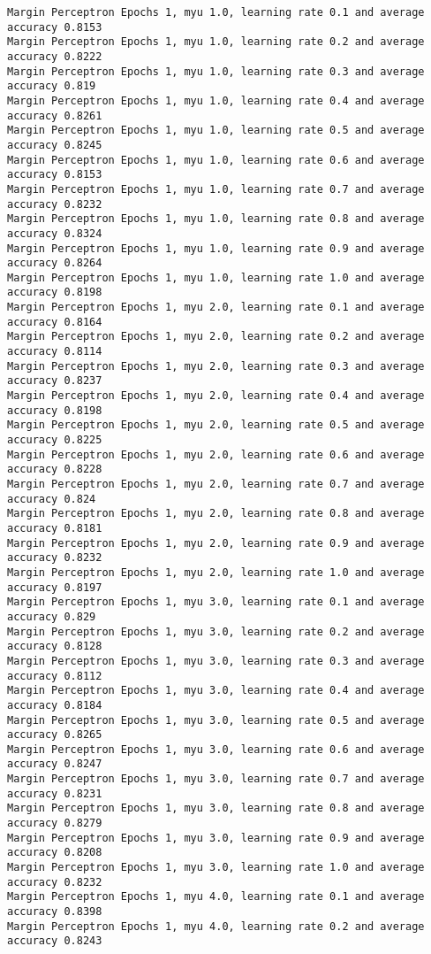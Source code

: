 \begin{Verbatim}[fontsize=\small]
Margin Perceptron Epochs 1, myu 1.0, learning rate 0.1 and average accuracy 0.8153
Margin Perceptron Epochs 1, myu 1.0, learning rate 0.2 and average accuracy 0.8222
Margin Perceptron Epochs 1, myu 1.0, learning rate 0.3 and average accuracy 0.819
Margin Perceptron Epochs 1, myu 1.0, learning rate 0.4 and average accuracy 0.8261
Margin Perceptron Epochs 1, myu 1.0, learning rate 0.5 and average accuracy 0.8245
Margin Perceptron Epochs 1, myu 1.0, learning rate 0.6 and average accuracy 0.8153
Margin Perceptron Epochs 1, myu 1.0, learning rate 0.7 and average accuracy 0.8232
Margin Perceptron Epochs 1, myu 1.0, learning rate 0.8 and average accuracy 0.8324
Margin Perceptron Epochs 1, myu 1.0, learning rate 0.9 and average accuracy 0.8264
Margin Perceptron Epochs 1, myu 1.0, learning rate 1.0 and average accuracy 0.8198
Margin Perceptron Epochs 1, myu 2.0, learning rate 0.1 and average accuracy 0.8164
Margin Perceptron Epochs 1, myu 2.0, learning rate 0.2 and average accuracy 0.8114
Margin Perceptron Epochs 1, myu 2.0, learning rate 0.3 and average accuracy 0.8237
Margin Perceptron Epochs 1, myu 2.0, learning rate 0.4 and average accuracy 0.8198
Margin Perceptron Epochs 1, myu 2.0, learning rate 0.5 and average accuracy 0.8225
Margin Perceptron Epochs 1, myu 2.0, learning rate 0.6 and average accuracy 0.8228
Margin Perceptron Epochs 1, myu 2.0, learning rate 0.7 and average accuracy 0.824
Margin Perceptron Epochs 1, myu 2.0, learning rate 0.8 and average accuracy 0.8181
Margin Perceptron Epochs 1, myu 2.0, learning rate 0.9 and average accuracy 0.8232
Margin Perceptron Epochs 1, myu 2.0, learning rate 1.0 and average accuracy 0.8197
Margin Perceptron Epochs 1, myu 3.0, learning rate 0.1 and average accuracy 0.829
Margin Perceptron Epochs 1, myu 3.0, learning rate 0.2 and average accuracy 0.8128
Margin Perceptron Epochs 1, myu 3.0, learning rate 0.3 and average accuracy 0.8112
Margin Perceptron Epochs 1, myu 3.0, learning rate 0.4 and average accuracy 0.8184
Margin Perceptron Epochs 1, myu 3.0, learning rate 0.5 and average accuracy 0.8265
Margin Perceptron Epochs 1, myu 3.0, learning rate 0.6 and average accuracy 0.8247
Margin Perceptron Epochs 1, myu 3.0, learning rate 0.7 and average accuracy 0.8231
Margin Perceptron Epochs 1, myu 3.0, learning rate 0.8 and average accuracy 0.8279
Margin Perceptron Epochs 1, myu 3.0, learning rate 0.9 and average accuracy 0.8208
Margin Perceptron Epochs 1, myu 3.0, learning rate 1.0 and average accuracy 0.8232
Margin Perceptron Epochs 1, myu 4.0, learning rate 0.1 and average accuracy 0.8398
Margin Perceptron Epochs 1, myu 4.0, learning rate 0.2 and average accuracy 0.8243

\end{Verbatim}
